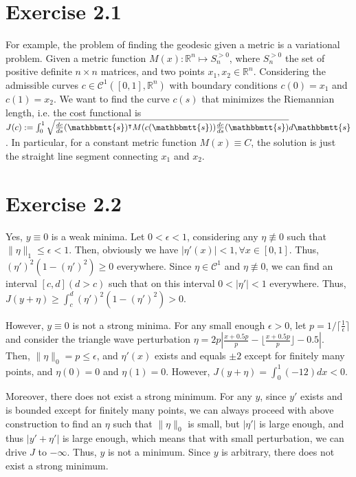 \documentclass[11pt]{report}
\newcommand{\reals}{\mathbb{R}}
\newcommand{\T}{\intercal}
\begin{document}

\section*{Exercise 2.1}
For example, the problem of finding the geodesic given a metric is a variational problem. Given a metric function $M(x):\reals^n \mapsto S_n^{>0}$, where $S_n^{>0}$ the set of positive definite $n \times n$ matrices, and two points $x_1, x_2 \in \reals^n$. Considering the admissible curves $c \in \mathcal{C}^1([0,1], \reals^n)$ with boundary conditions $c(0) = x_1$ and $c(1) = x_2$. We want to find the curve $c(s)$ that minimizes the Riemannian length, i.e. the cost functional is $J(c) := \int_0^1 \sqrt{\frac{dc}{ds}(\mathbbmtt{s})^\T M(c(\mathbbmtt{s})) \frac{dc}{ds}(\mathbbmtt{s})} d\mathbbmtt{s}$. In particular, for a constant metric function $M(x) \equiv C$, the solution is just the straight line segment connecting $x_1$ and $x_2$.
\section*{Exercise 2.2}
Yes, $y \equiv 0$ is a weak minima. Let $0 < \epsilon < 1$, considering any $\eta \not\equiv 0$ such that $\|\eta\|_1 \leq \epsilon < 1$. Then, obviously we have $|\eta'(x)| < 1, \forall x \in [0,1]$.
Thus, $(\eta')^2 (1-(\eta')^2) \geq 0$ everywhere. 
Since $\eta \in \mathcal{C}^1$ and $\eta \not\equiv 0$, we can find an interval $[c, d] (d>c)$ such that on this interval $0<|\eta'|<1$ everywhere. Thus, $J(y + \eta) \geq \int_{c}^{d} (\eta')^2 (1-(\eta')^2) > 0$.

\noindent However, $y \equiv 0$ is not a strong minima. For any small enough $\epsilon > 0$, let $p = 1 / \lceil\frac{1}{\epsilon}\rceil$ and consider the triangle wave perturbation $\eta = 2p \left|\frac{x+0.5p}{p} - \lfloor\frac{x+0.5p}{p}\rfloor - 0.5\right|$. Then, $\|\eta\|_0 = p \leq \epsilon$, and $\eta'(x)$ exists and equals $\pm 2$ except for finitely many points, and $\eta(0) = 0$ and $\eta(1) = 0$. However, $J(y+\eta) = \int_0^1(-12)dx < 0$.

\noindent Moreover, there does not exist a strong minimum. For any $y$, since $y'$ exists and is bounded except for finitely many points, we can always proceed with above construction to find an $\eta$ such that $\|\eta\|_0$ is small, but $|\eta'|$ is large enough, and thus $|y'+\eta'|$ is large enough, which means that with small perturbation, we can drive $J$ to $-\infty$. Thus, $y$ is not a minimum. Since $y$ is arbitrary, there does not exist a strong minimum.
\end{document}
